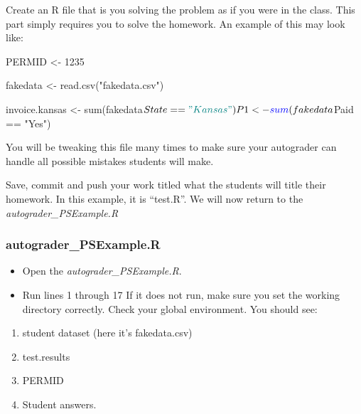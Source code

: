 \documentclass[
]{article}
\newenvironment{Shaded}{}{}
\newcommand{\DecValTok}[1]{#1}
\newcommand{\KeywordTok}[1]{\textcolor[rgb]{0.00,0.00,1.00}{#1}}
\newcommand{\NormalTok}[1]{#1}
\newcommand{\OperatorTok}[1]{#1}
\newcommand{\StringTok}[1]{\textcolor[rgb]{0.00,0.50,0.50}{#1}}
\begin{document}
Create an R file that is you solving the problem as if you were in the
class. This part simply requires you to solve the homework. An example
of this may look like:

\hypertarget{numCode}{%
\label{numCode}}%
\begin{Shaded}
\begin{Highlighting}[numbers=left,,]

\NormalTok{PERMID <-}\StringTok{ }\DecValTok{1235}

\NormalTok{fakedata <-}\StringTok{ }\KeywordTok{read.csv}\NormalTok{(}\StringTok{"fakedata.csv"}\NormalTok{)}

\NormalTok{invoice.kansas <-}\StringTok{ }\KeywordTok{sum}\NormalTok{(fakedata}\OperatorTok{$}\NormalTok{State}\OperatorTok{==}\StringTok{"Kansas"}\NormalTok{)}

\NormalTok{P1 <-}\StringTok{ }\KeywordTok{sum}\NormalTok{(fakedata}\OperatorTok{$}\NormalTok{Paid }\OperatorTok{==}\StringTok{ "Yes"}\NormalTok{)}
\end{Highlighting}
\end{Shaded}

You will be tweaking this file many times to make sure your autograder
can handle all possible mistakes students will make.

Save, commit and push your work titled what the students will title
their homework. In this example, it is ``test.R''. We will now return to
the \emph{autograder\_PSExample.R}

\hypertarget{autograder_psexample.r}{%
\subsubsection{autograder\_PSExample.R}\label{autograder_psexample.r}}

\begin{itemize}
\item
  Open the \emph{autograder\_PSExample.R}.
\item
  Run lines 1 through 17 If it does not run, make sure you set the
  working directory correctly. Check your global environment. You should
  see:
\end{itemize}

\begin{enumerate}
\def\labelenumi{(\arabic{enumi})}
\item
  student dataset (here it's fakedata.csv)
\item
  test.results
\item
  PERMID
\item
  Student answers.
\end{enumerate}
\end{document}
